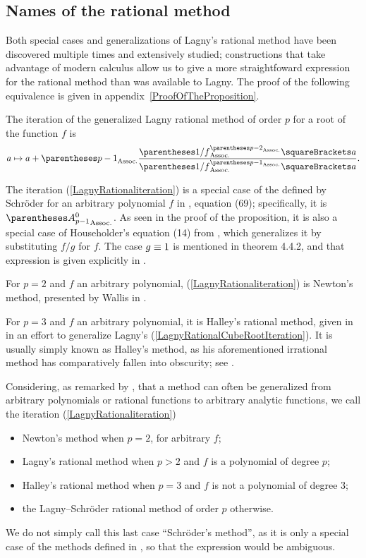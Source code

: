 ﻿\documentclass[10pt, a4paper, twoside]{basestyle}
\begin{document}
\subsection*{Names of the rational method}
Both special cases and generalizations of Lagny's rational method have been discovered multiple times
and extensively studied; constructions that take advantage of modern calculus allow us to give a more
straightfoward expression for the rational method than was available to Lagny.
The proof of the following equivalence is given in appendix~\ref{ProofOfTheProposition}.
\begin{proposition}
The iteration of the generalized Lagny rational method of order $p$ for a root of the
function $f$ is\begin{equation}
a\mapsto a + \pa{p-1}\frac{\pa{1/f}^{\pa{p-2}}\of{a}}{\pa{1/f}^{\pa{p-1}}\of{a}}\text.\label{LagnyRationaliteration}
\end{equation}
\end{proposition}
The iteration (\ref{LagnyRationaliteration}) is a special case of the  defined by Schröder for an
arbitrary polynomial $f$ in \cite[349\psq]{Schröder1870}, equation (69); specifically, it is $\pa{A^0_{p-1}}$.
As seen in the proof of the proposition, it is also a special case of Householder’s  equation (14) from \cite[169]{Householder1970}, which generalizes it by substituting $f/g$ for $f$. The case
$g\equiv1$ is mentioned in theorem 4.4.2, and that expression is given explicitly in \cite{SebahGourdon2001}.

For $p=2$ and $f$ an arbitrary polynomial, (\ref{LagnyRationaliteration}) is Newton's method, presented by Wallis in
\cite[338]{Wallis1685}.

For $p=3$ and $f$ an arbitrary polynomial, it is Halley's rational method, given in \cite[142--143]{Halley1694} in
an effort to generalize Lagny's (\ref{LagnyRationalCubeRootIteration}).
It is usually simply known as Halley's method, as his aforementioned irrational method has comparatively fallen into obscurity; see \cite{ScavoThoo1995}.

Considering, as remarked by \cite[334]{Schröder1870}, that a method can often
be generalized from arbitrary polynomials or rational functions to arbitrary
analytic functions, we call the iteration (\ref{LagnyRationaliteration})\begin{itemize}[nosep]
\item Newton’s method when $p=2$, for arbitrary $f$;
\item Lagny’s rational method when $p>2$ and $f$ is a polynomial of degree $p$;
\item Halley’s rational method when $p=3$ and $f$ is not a polynomial of degree $3$;
\item the Lagny--Schröder rational method of order $p$ otherwise.
\end{itemize}
We do not simply call this last case ``Schröder’s method'', as it is only a special case of the methods
defined in \cite{Schröder1870}, so that the expression would be ambiguous. 
\end{document}

